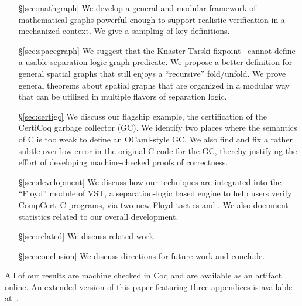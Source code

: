 \begin{itemize}
\item[\S\ref{sec:mathgraph}] We develop a general and modular framework of mathematical graphs powerful enough to support realistic verification in a mechanized context.  We give a sampling of key definitions.
\item[\S\ref{sec:spacegraph}] We suggest that the Knaster-Tarski fixpoint~\cite{tarski:fixpoint} cannot define a usable separation logic graph predicate.  We propose a better definition for general spatial graphs that still enjoys a ``recursive'' fold/unfold.  We prove general theorems about spatial graphs that are 
organized in a modular way that can be utilized in multiple flavors of separation logic. %
\item[\S\ref{sec:certigc}] We discuss our flagship example, the certification of the CertiCoq garbage collector (GC). We identify two places where the semantics of C is too weak to define an OCaml-style GC. We also find and fix a rather subtle overflow error in the original C code for the GC, thereby justifying the effort of developing machine-checked proofs of correctness.
\item[\S\ref{sec:development}] We discuss how our techniques are integrated into the
``Floyd'' module of VST, a separation-logic based engine to help users verify
CompCert~C programs, via two new Floyd tactics  and .
We also document statistics related to our overall development.
\item[\S\ref{sec:related}] We discuss related work.
\item[\S\ref{sec:conclusion}] We discuss directions for future work and conclude.
\end{itemize}
All of our results are machine checked in Coq and are available as an artifact 
\href{https://zenodo.org/record/3368779}{online}.
An extended version of this paper featuring three appendices is available 
at~\cite{onlinepaper}.
